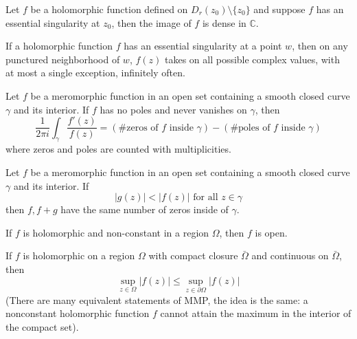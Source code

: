 \documentclass[openany]{book}
\newcommand{\C}{\mathbb{C}}
\begin{document}
\begin{prop}
    Let $f$ be a holomorphic function defined on $D_r(z_0)\setminus\{z_0\}$ and suppose $f$ has an essential singularity at $z_0$, then the image of $f$ is dense in $\C$.
\end{prop}

\begin{prop}
    If a holomorphic function \( f \) has an {essential singularity} at a point \( w \), then on any {punctured neighborhood} of \( w \), \( f(z) \) takes on all possible complex values, with at most a single exception, infinitely often.
\end{prop}



\begin{prop}
    Let $f$ be a meromorphic function in an open set containing a smooth closed curve $\gamma$ and its interior. If $f$ has no poles and never vanishes on $\gamma$, then 
    \begin{equation*}
        \frac{1}{2\pi i}\int_\gamma \frac{f'(z)}{f(z)}=(\# \text{zeros of $f$ inside $\gamma$}) - (\#\text{poles of $f$ inside $\gamma$})
    \end{equation*}
    where zeros and poles are counted with multiplicities.
\end{prop}

\begin{prop}
    Let $f$ be a meromorphic function in an open set containing a smooth closed curve $\gamma$ and its interior. If 
    \begin{equation*}
        |g(z)|<|f(z)| \text{ for all } z\in \gamma
    \end{equation*}
    then $f,f+g$ have the same number of zeros inside of $\gamma$.
\end{prop}




\begin{prop}
    If $f$ is holomorphic and non-constant in a region $\Omega$, then $f$ is open.
\end{prop}

\begin{prop}
    If $f$ is holomorphic on a region $\Omega$ with compact closure $\bar{\Omega}$ and continuous on $\bar{\Omega}$, then 
    \begin{equation*}
        \sup_{z\in\Omega}|f(z)|\leq\sup_{z\in\partial\Omega}|f(z)|
    \end{equation*}
    (There are many equivalent statements of MMP, the idea is the same: a nonconstant holomorphic function $f$ cannot attain the maximum in the interior of the compact set).
\end{prop}
\end{document}
